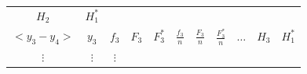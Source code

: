 \documentclass[10pt,]{krantz}
\theoremstyle{definition}
\theoremstyle{definition}
\theoremstyle{definition}
\theoremstyle{definition}
\theoremstyle{remark}
\begin{document}
\begin{longtable}[]{@{}cccccccccll@{}}
\begin{minipage}[t]{0.05\columnwidth}
\(H_2\)\strut
\end{minipage} & \begin{minipage}[t]{0.05\columnwidth}\raggedright
\(H_1^*\)\strut
\end{minipage}\tabularnewline
\begin{minipage}[t]{0.09\columnwidth}\centering
\(<y_3-y_4>\)\strut
\end{minipage} & \begin{minipage}[t]{0.05\columnwidth}\centering
\(y_3\)\strut
\end{minipage} & \begin{minipage}[t]{0.05\columnwidth}\centering
\(f_3\)\strut
\end{minipage} & \begin{minipage}[t]{0.05\columnwidth}\centering
\(F_3\)\strut
\end{minipage} & \begin{minipage}[t]{0.05\columnwidth}\centering
\(F_3^*\)\strut
\end{minipage} & \begin{minipage}[t]{0.09\columnwidth}\centering
\(\frac{f_3}{n}\)\strut
\end{minipage} & \begin{minipage}[t]{0.09\columnwidth}\centering
\(\frac{F_3}{n}\)\strut
\end{minipage} & \begin{minipage}[t]{0.10\columnwidth}\centering
\(\frac{F_3^*}{n}\)\strut
\end{minipage} & \begin{minipage}[t]{0.05\columnwidth}\centering
\(\ldots\)\strut
\end{minipage} & \begin{minipage}[t]{0.05\columnwidth}\raggedright
\(H_3\)\strut
\end{minipage} & \begin{minipage}[t]{0.05\columnwidth}\raggedright
\(H_1^*\)\strut
\end{minipage}\tabularnewline
\begin{minipage}[t]{0.09\columnwidth}\centering
\(\vdots\)\strut
\end{minipage} & \begin{minipage}[t]{0.05\columnwidth}\centering
\(\vdots\)\strut
\end{minipage} & \begin{minipage}[t]{0.05\columnwidth}\centering
\(\vdots\)\strut
\end{minipage} & \begin{minipage}[t]{0.05\columnwidth}\centering

\end{minipage}
\end{longtable}
\end{document}
